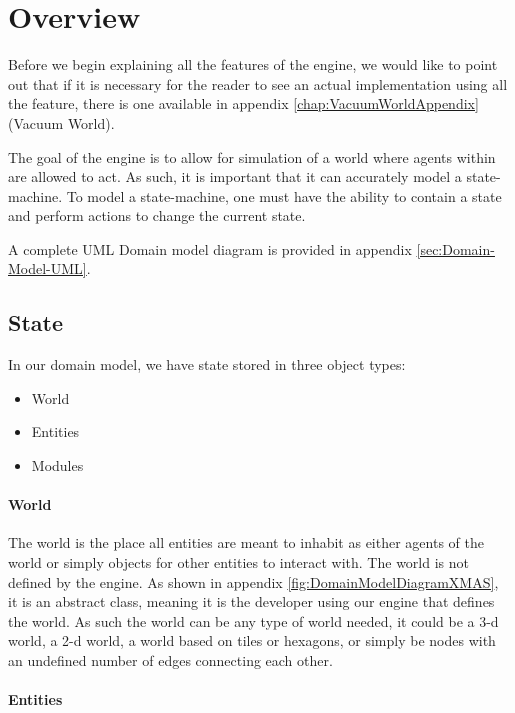 
\section{Overview}

Before we begin explaining all the features of the engine, we would
like to point out that if it is necessary for the reader to see an
actual implementation using all the feature, there is one available
in appendix \ref{chap:VacuumWorldAppendix} (Vacuum World).

The goal of the engine is to allow for simulation of a world where
agents within are allowed to act. As such, it is important that it
can accurately model a state-machine. To model a state-machine, one
must have the ability to contain a state and perform actions to change
the current state. 

A complete UML Domain model diagram is provided in appendix \ref{sec:Domain-Model-UML}.


\subsection{State}

In our domain model, we have state stored in three object types:
\begin{itemize}
\item World
\item Entities
\item Modules
\end{itemize}

\paragraph*{World}

The world is the place all entities are meant to inhabit as either
agents of the world or simply objects for other entities to interact
with. The world is not defined by the engine. As shown in appendix
\ref{fig:DomainModelDiagramXMAS}, it is an abstract class, meaning
it is the developer using our engine that defines the world. As such
the world can be any type of world needed, it could be a 3-d world,
a 2-d world, a world based on tiles or hexagons, or simply be nodes
with an undefined number of edges connecting each other.


\paragraph*{Entities}

